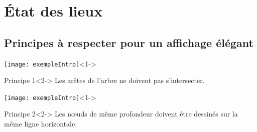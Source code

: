\section{État des lieux}

\subsection{Principes à respecter pour un affichage élégant}


\begin{frame}
	\begin{center}	
		\texttt{[image: exempleIntro]}<1->\\
		\begin{block}{Principe 1}<2->
		Les arêtes de l'arbre ne doivent pas s'intersecter.
		\end{block}
	\end{center}
\end{frame}

\begin{frame}
	\begin{center}	
		\texttt{[image: exempleIntro]}<1->\\
		\begin{block}{Principe 2}<2->
		Les n\oe{}uds de même profondeur doivent être dessinés sur la même ligne horizontale.
		\end{block}
	\end{center}
\end{frame}

